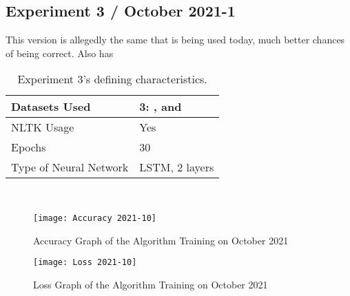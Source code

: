 \subsection{Experiment 3 / October 2021-1}
This version is allegedly the same that is being used today, much better chances of being correct. Also has 
\begin{table}[!h]
	\caption{Experiment 3's defining characteristics.}
	\vspace{0.5cm}
	\centering
	\begin{tabular}[t]{|l|l|}
	\hline
		Datasets Used & 3: \citet{d1}, \citet{d2} and \citet{d3}
	\\ \hline
		NLTK Usage & Yes
	\\ \hline
		Epochs & 30
	\\ \hline
		Type of Neural Network & LSTM, 2 layers
	\\ \hline
	\end{tabular}
\end{table}
\\
\begin{figure}[!h]
	\centering
	\texttt{[image: Accuracy 2021-10]}
	\caption{Accuracy Graph of the Algorithm Training on October 2021}
	\label{fig:accuracy2021-10}
	\texttt{[image: Loss 2021-10]}
	\caption{Loss Graph of the Algorithm Training on October 2021}
	\label{fig:loss2021-10}
\end{figure}


